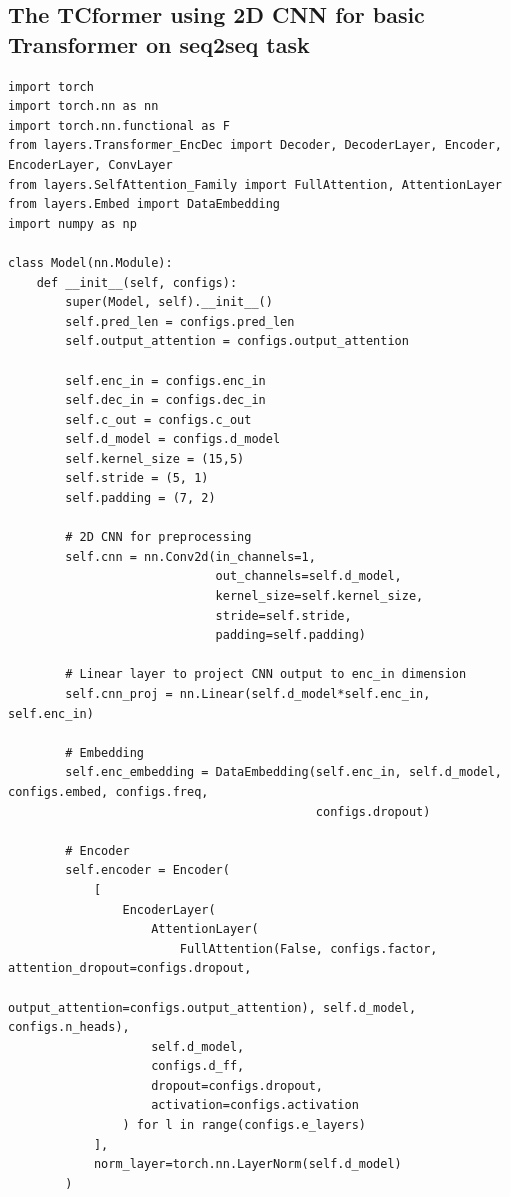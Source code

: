 \documentclass[stu,12pt,floatsintext]{apa7}
\begin{document}
\subsection{The TCformer using 2D CNN for basic Transformer on seq2seq task}
\begin{verbatim}
import torch
import torch.nn as nn
import torch.nn.functional as F
from layers.Transformer_EncDec import Decoder, DecoderLayer, Encoder, EncoderLayer, ConvLayer
from layers.SelfAttention_Family import FullAttention, AttentionLayer
from layers.Embed import DataEmbedding
import numpy as np

class Model(nn.Module):
    def __init__(self, configs):
        super(Model, self).__init__()
        self.pred_len = configs.pred_len
        self.output_attention = configs.output_attention

        self.enc_in = configs.enc_in
        self.dec_in = configs.dec_in
        self.c_out = configs.c_out
        self.d_model = configs.d_model
        self.kernel_size = (15,5)
        self.stride = (5, 1)
        self.padding = (7, 2)

        # 2D CNN for preprocessing
        self.cnn = nn.Conv2d(in_channels=1,
                             out_channels=self.d_model,
                             kernel_size=self.kernel_size,
                             stride=self.stride,
                             padding=self.padding)

        # Linear layer to project CNN output to enc_in dimension
        self.cnn_proj = nn.Linear(self.d_model*self.enc_in, self.enc_in)

        # Embedding
        self.enc_embedding = DataEmbedding(self.enc_in, self.d_model, configs.embed, configs.freq,
                                           configs.dropout)

        # Encoder
        self.encoder = Encoder(
            [
                EncoderLayer(
                    AttentionLayer(
                        FullAttention(False, configs.factor, attention_dropout=configs.dropout,
                                      output_attention=configs.output_attention), self.d_model, configs.n_heads),
                    self.d_model,
                    configs.d_ff,
                    dropout=configs.dropout,
                    activation=configs.activation
                ) for l in range(configs.e_layers)
            ],
            norm_layer=torch.nn.LayerNorm(self.d_model)
        )


\end{verbatim}
\end{document}
